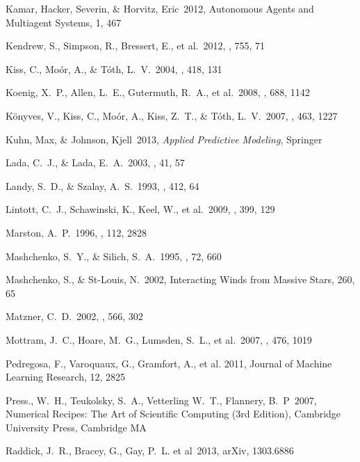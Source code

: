 \documentclass[preprint]{aastex}
\begin{document}
\begin{thebibliography}{16}
 Kamar, Hacker, Severin, \& Horvitz, Eric\ 2012, Autonomous Agents and Multiagent Systems, 1, 467

 Kendrew, S., Simpson, 
R., Bressert, E., et al.\ 2012, \apj, 755, 71 

 Kiss, C., Mo{\'o}r, A., \& T{\'o}th, L.~V.\ 2004, \aap, 418, 131 

 Koenig, X.~P., Allen, 
L.~E., Gutermuth, R.~A., et al.\ 2008, \apj, 688, 1142 

 K{\"o}nyves, V., Kiss, C., Mo{\'o}r, A., Kiss, Z.~T., \& T{\'o}th, L.~V.\ 2007, \aap, 463, 1227

 Kuhn, Max, \& Johnson, Kjell\ 2013, \textit{Applied Predictive Modeling}, Springer

 Lada, C.~J., \& Lada, E.~A.\ 2003, \araa, 41, 57 

 Landy, S.~D., \& Szalay, A.~S.\ 1993, \apj, 412, 64 

 Lintott, C.~J., 
Schawinski, K., Keel, W., et al.\ 2009, \mnras, 399, 129

 Marston, A.~P.\ 1996, \aj, 
112, 2828 

 Mashchenko, S.~Y., \& Silich, S.~A.\ 1995, \azh, 72, 660 

 Mashchenko, S., \& St-Louis, N.\ 2002, Interacting Winds from Massive Stars, 260, 65 

 Matzner, C.~D.\ 2002, \apj, 
566, 302 

 Mottram, J.~C., Hoare, M.~G., Lumsden, S.~L., et al.\ 2007, \aap, 476, 1019 

 Pedregosa, F., Varoquaux, G., Gramfort, A., et al. 2011, Journal of Machine Learning Research, 12, 2825

 Press., W.~H., Teukolsky, S.~A., Vetterling W.~T., Flannery, B.~P\ 2007, Numerical Recipes: The Art of Scientific Computing (3rd Edition), Cambridge University Press, Cambridge MA

 Raddick, J.~R., Bracey, G., Gay, P.~L. et al\ 2013, arXiv, 1303.6886


\end{thebibliography}
\end{document}
